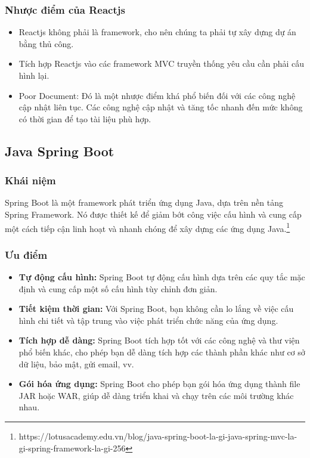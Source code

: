 \subsubsection{Nhược điểm của Reactjs}
\begin{itemize}
    \item Reactjs không phải là framework, cho nên chúng ta phải tự xây dựng dự án bằng thủ công.
    \item Tích hợp Reactjs vào các framework MVC truyền thống yêu cầu cần phải cấu hình lại.
    \item Poor Document: Đó là một nhược điểm khá phổ biến đối với các công nghệ cập nhật liên tục. Các công nghệ cập nhật và tăng tốc nhanh đến mức không có thời gian để tạo tài liệu phù hợp.
\end{itemize}
\subsection{Java Spring Boot}

\subsubsection{Khái niệm} 
\noindent Spring Boot là một framework phát triển ứng dụng Java, dựa trên nền tảng Spring Framework. Nó được thiết kế để giảm bớt công việc cấu hình và cung cấp một cách tiếp cận linh hoạt và nhanh chóng để xây dựng các ứng dụng Java.\footnote{https://lotusacademy.edu.vn/blog/java-spring-boot-la-gi-java-spring-mvc-la-gi-spring-framework-la-gi-256}

\subsubsection{Ưu điểm}
\begin{itemize}
    \item \textbf{Tự động cấu hình:} Spring Boot tự động cấu hình dựa trên các quy tắc mặc định và cung cấp một số cấu hình tùy chỉnh đơn giản.
    \item \textbf{Tiết kiệm thời gian:} Với Spring Boot, bạn không cần lo lắng về việc cấu hình chi tiết và tập trung vào việc phát triển chức năng của ứng dụng.
    \item \textbf{Tích hợp dễ dàng:} Spring Boot tích hợp tốt với các công nghệ và thư viện phổ biến khác, cho phép bạn dễ dàng tích hợp các thành phần khác như cơ sở dữ liệu, bảo mật, gửi email, vv.
    \item \textbf{Gói hóa ứng dụng:} Spring Boot cho phép bạn gói hóa ứng dụng thành file JAR hoặc WAR, giúp dễ dàng triển khai và chạy trên các môi trường khác nhau.
\end{itemize}


